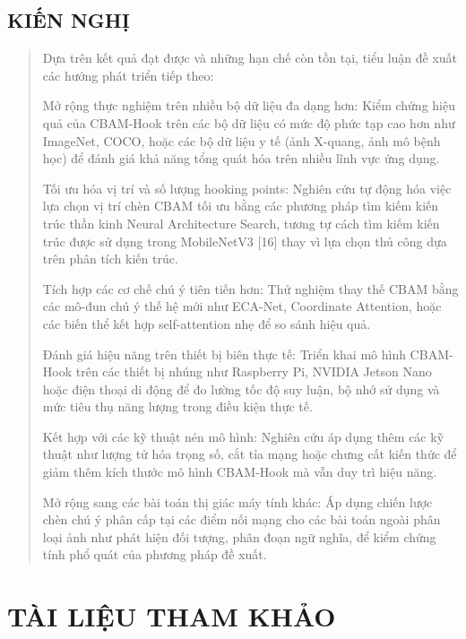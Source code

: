 \documentclass[
  12pt,
  a4paper,
]{report}
\begin{document}
\section{KIẾN NGHỊ}\label{kiux1ebfn-nghux1ecb}

\begin{quote}
Dựa trên kết quả đạt được và những hạn chế còn tồn tại, tiểu luận đề
xuất các hướng phát triển tiếp theo:

Mở rộng thực nghiệm trên nhiều bộ dữ liệu đa dạng hơn: Kiểm chứng hiệu
quả của CBAM-Hook trên các bộ dữ liệu có mức độ phức tạp cao hơn như
ImageNet, COCO, hoặc các bộ dữ liệu y tế (ảnh X-quang, ảnh mô bệnh học)
để đánh giá khả năng tổng quát hóa trên nhiều lĩnh vực ứng dụng.

Tối ưu hóa vị trí và số lượng hooking points: Nghiên cứu tự động hóa
việc lựa chọn vị trí chèn CBAM tối ưu bằng các phương pháp tìm kiếm kiến
trúc thần kinh Neural Architecture Search, tương tự cách tìm kiếm kiến
trúc được sử dụng trong MobileNetV3 {[}16{]} thay vì lựa chọn thủ công
dựa trên phân tích kiến trúc.

Tích hợp các cơ chế chú ý tiên tiến hơn: Thử nghiệm thay thế CBAM bằng
các mô-đun chú ý thế hệ mới như ECA-Net, Coordinate Attention, hoặc các
biến thể kết hợp self-attention nhẹ để so sánh hiệu quả.

Đánh giá hiệu năng trên thiết bị biên thực tế: Triển khai mô hình
CBAM-Hook trên các thiết bị nhúng như Raspberry Pi, NVIDIA Jetson Nano
hoặc điện thoại di động để đo lường tốc độ suy luận, bộ nhớ sử dụng và
mức tiêu thụ năng lượng trong điều kiện thực tế.

Kết hợp với các kỹ thuật nén mô hình: Nghiên cứu áp dụng thêm các kỹ
thuật như lượng tử hóa trọng số, cắt tỉa mạng hoặc chưng cất kiến thức
để giảm thêm kích thước mô hình CBAM-Hook mà vẫn duy trì hiệu năng.

Mở rộng sang các bài toán thị giác máy tính khác: Áp dụng chiến lược
chèn chú ý phân cấp tại các điểm nối mạng cho các bài toán ngoài phân
loại ảnh như phát hiện đối tượng, phân đoạn ngữ nghĩa, để kiểm chứng
tính phổ quát của phương pháp đề xuất.
\end{quote}

\chapter*{}\label{section-3}

\chapter*{TÀI LIỆU THAM KHẢO}\label{tuxe0i-liux1ec7u-tham-khux1ea3o}
\end{document}

